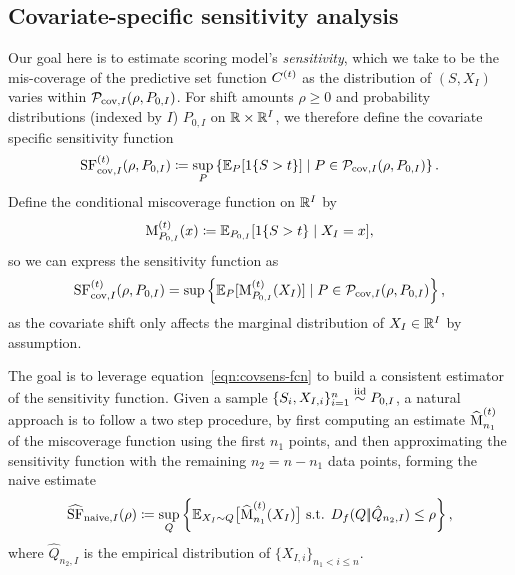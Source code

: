 \subsection{Covariate-specific sensitivity analysis}

\newcommand{\SFcov}{{\SF}_{\textup{cov}, I}^{(\predsetthresh)} }
\newcommand{\estSFcov}{{\what{\SF}}_{\textup{cov}, I}^{(\predsetthresh)} }
\newcommand{\MCov}{{\MC}_{P_{0,I}}^{(\predsetthresh)}}

Our goal here is to estimate scoring model's \emph{sensitivity}, which we
take to be the mis-coverage of the predictive set function
$C^{(t)}$ as the distribution of $(S, X_I)$ varies within
$\mathcal{P}_{\textup{cov},I}(\rho, P_{0,I})$.
For shift amounts $\rho \ge 0$ and probability distributions
(indexed by $I$) $P_{0,I}$ on $\mathbb{R} \times \mathbb{R}^I$,
we therefore define the covariate specific sensitivity function
\begin{align*}
  \SFcov (\rho,P_{0,I}) \defeq \sup_P \left\{  \E_{P}[\indic{S >
  \predsetthresh}] \mid P \in
  \Pcovset(\rho, P_{0,I}) \right\}.
\end{align*}
Define the conditional miscoverage function on $\mathbb{R}^I$ by
\begin{equation}
  \label{eqn:conditional-miscoverage-func}
  \MCov (x) \defeq \E_{P_{0,I}}[\indic{S>\predsetthresh} \mid X_I=x],
\end{equation}
so we can express the sensitivity function as
\begin{align}
  \label{eqn:covsens-fcn}
  \SFcov (\rho, P_{0,I}) = \sup \left\{ \E_{P}[ \MCov(X_I) ] \mid  P \in \Pcovset(\rho, P_{0,I}) \right\},
\end{align}
as the covariate shift only affects the marginal distribution of $X_I \in
\mathbb{R}^I$ by assumption.

The goal is to leverage equation~\eqref{eqn:covsens-fcn} to build a
consistent estimator of the sensitivity function.  Given a sample $\{
S_i, X_{I,i} \}_{i=1}^n \stackrel{\rm iid}{\sim} P_{0,I}$, a natural approach is to
follow a two step procedure, by first computing an estimate
$\widehat{\operatorname*{M}}_{n_1}^{(t)}$ of the miscoverage function using the
first $n_1$ points, and then approximating the sensitivity function with the
remaining $n_2 = n-n_1$ data points, forming the naive estimate
\begin{equation*}
  \widehat{\operatorname*{SF}}_{\textup{naive},I}(\rho)
  \coloneqq \sup_{Q} \left\{ \mathbb{E}_{X_I \sim Q}\big[\widehat{\operatorname*{M}}_{n_1}^{(t)}(X_I)\big]
  \text{ s.t. } D_{f}({Q} |\!| {\hat{Q}_{n_2, I}})  \leq \rho \right\},
\end{equation*}
where $\hat{Q}_{n_2, I}$ is the empirical distribution of $\{ X_{I,i}
\}_{n_1 < i \le n}$.

